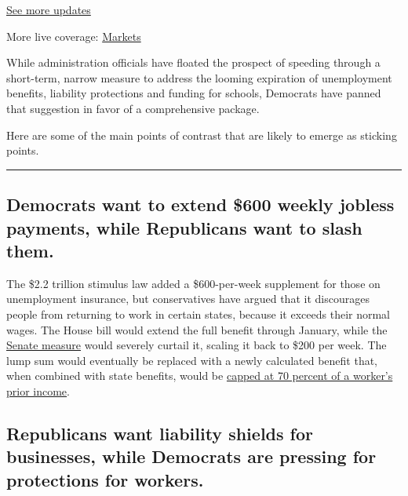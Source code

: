 \href{https://www.nytimes.com/2020/08/04/world/coronavirus-covid-19.html?action=click\&pgtype=Article\&state=default\&region=MAIN_CONTENT_1\&context=storylines_live_updates}{See
more updates}

More live coverage:
\href{https://www.nytimes.com/live/2020/08/03/business/stock-market-today-coronavirus?action=click\&pgtype=Article\&state=default\&region=MAIN_CONTENT_1\&context=storylines_live_updates}{Markets}

While administration officials have floated the prospect of speeding
through a short-term, narrow measure to address the looming expiration
of unemployment benefits, liability protections and funding for schools,
Democrats have panned that suggestion in favor of a comprehensive
package.

Here are some of the main points of contrast that are likely to emerge
as sticking points.

\begin{center}\rule{0.5\linewidth}{\linethickness}\end{center}

\hypertarget{democrats-want-to-extend-600-weekly-jobless-payments-while-republicans-want-to-slash-them}{%
\subsection{Democrats want to extend \$600 weekly jobless payments,
while Republicans want to slash
them.}\label{democrats-want-to-extend-600-weekly-jobless-payments-while-republicans-want-to-slash-them}}

The \$2.2 trillion stimulus law added a \$600-per-week supplement for
those on unemployment insurance, but conservatives have argued that it
discourages people from returning to work in certain states, because it
exceeds their normal wages. The House bill would extend the full benefit
through January, while the
\href{https://www.nytimes.com/2020/06/24/us/politics/senate-police-bill.html}{Senate
measure} would severely curtail it, scaling it back to \$200 per week.
The lump sum would eventually be replaced with a newly calculated
benefit that, when combined with state benefits, would be
\href{https://www.nytimes.com/2020/07/23/business/economy/unemployment-benefits.html}{capped
at 70 percent of a worker's prior income}.

\hypertarget{republicans-want-liability-shields-for-businesses-while-democrats-are-pressing-for-protections-for-workers}{%
\subsection{Republicans want liability shields for businesses, while
Democrats are pressing for protections for
workers.}\label{republicans-want-liability-shields-for-businesses-while-democrats-are-pressing-for-protections-for-workers}}

